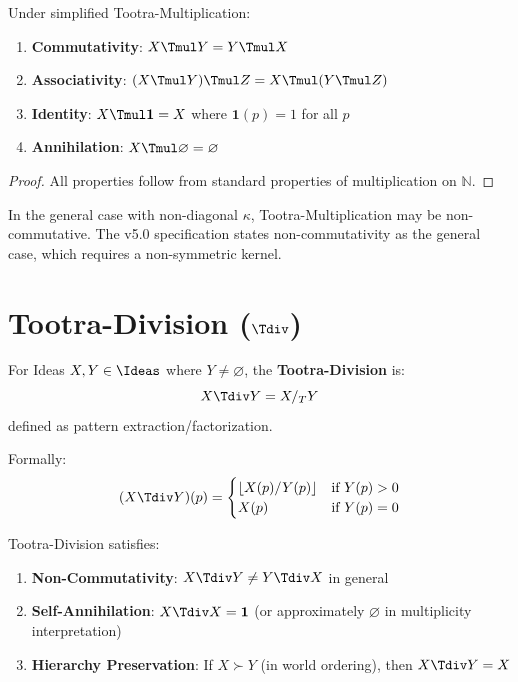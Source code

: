 \begin{theorem}
\label{thm:tmul-properties}
Under simplified Tootra-Multiplication:
\begin{enumerate}
  \item \textbf{Commutativity}: $X \Tmul Y = Y \Tmul X$
  \item \textbf{Associativity}: $(X \Tmul Y) \Tmul Z = X \Tmul (Y \Tmul Z)$
  \item \textbf{Identity}: $X \Tmul \mathbf{1} = X$ where $\mathbf{1}(p) = 1$ for all $p$
  \item \textbf{Annihilation}: $X \Tmul \varnothing = \varnothing$
\end{enumerate}
\end{theorem}

\begin{proof}
All properties follow from standard properties of multiplication on $\mathbb{N}$.
\end{proof}

\begin{remark}
\label{rem:tmul-noncommutative}
In the general case with non-diagonal $\kappa$, Tootra-Multiplication may be non-commutative. The v5.0 specification states non-commutativity as the general case, which requires a non-symmetric kernel.
\end{remark}

\section{Tootra-Division ($\Tdiv$)}

\begin{definition}
\label{def:tootra-div}
For Ideas $X, Y \in \Ideas$ where $Y \neq \varnothing$, the \textbf{Tootra-Division} is:
\[
X \Tdiv Y = X /_T Y
\]
defined as pattern extraction/factorization.

Formally:
\[
(X \Tdiv Y)(p) = \begin{cases}
\lfloor X(p) / Y(p) \rfloor & \text{if } Y(p) > 0 \\
X(p) & \text{if } Y(p) = 0
\end{cases}
\]
\end{definition}

\begin{theorem}
\label{thm:tdiv-properties}
Tootra-Division satisfies:
\begin{enumerate}
  \item \textbf{Non-Commutativity}: $X \Tdiv Y \neq Y \Tdiv X$ in general
  \item \textbf{Self-Annihilation}: $X \Tdiv X = \mathbf{1}$ (or approximately $\varnothing$ in multiplicity interpretation)
  \item \textbf{Hierarchy Preservation}: If $X \succ Y$ (in world ordering), then $X \Tdiv Y = X$
\end{enumerate}
\end{theorem}

